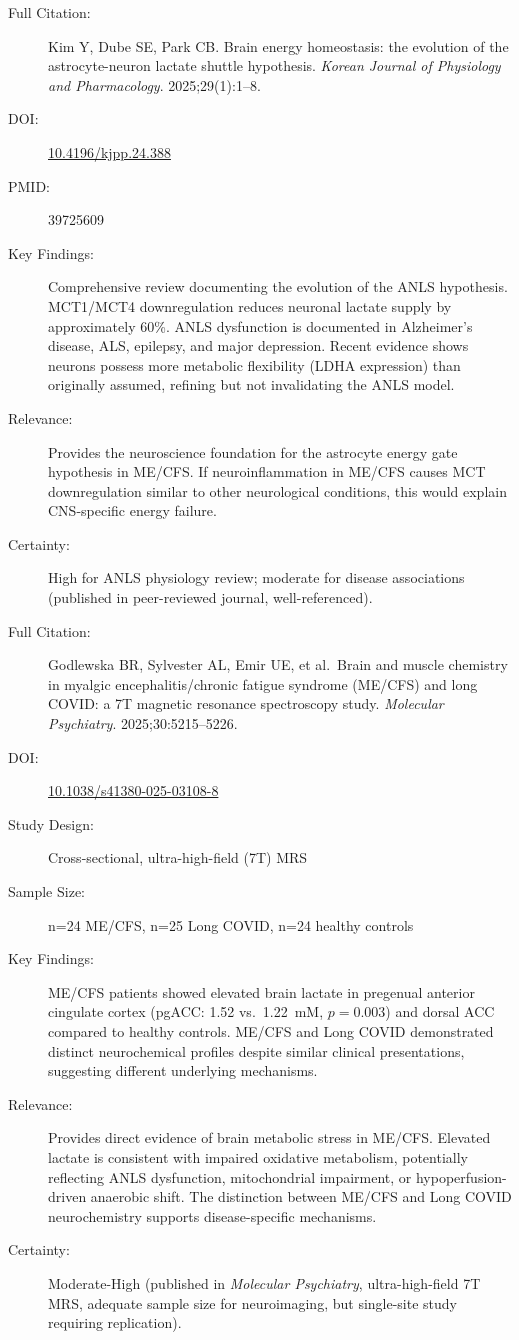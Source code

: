 \begin{description}
    \item[Full Citation:] Kim Y, Dube SE, Park CB. Brain energy homeostasis: the evolution of the astrocyte-neuron lactate shuttle hypothesis. \textit{Korean Journal of Physiology and Pharmacology}. 2025;29(1):1--8.
    \item[DOI:] \href{https://doi.org/10.4196/kjpp.24.388}{10.4196/kjpp.24.388}
    \item[PMID:] 39725609
    \item[Key Findings:] Comprehensive review documenting the evolution of the ANLS hypothesis. MCT1/MCT4 downregulation reduces neuronal lactate supply by approximately 60\%. ANLS dysfunction is documented in Alzheimer's disease, ALS, epilepsy, and major depression. Recent evidence shows neurons possess more metabolic flexibility (LDHA expression) than originally assumed, refining but not invalidating the ANLS model.
    \item[Relevance:] Provides the neuroscience foundation for the astrocyte energy gate hypothesis in ME/CFS. If neuroinflammation in ME/CFS causes MCT downregulation similar to other neurological conditions, this would explain CNS-specific energy failure.
    \item[Certainty:] High for ANLS physiology review; moderate for disease associations (published in peer-reviewed journal, well-referenced).
\end{description}

\begin{description}
    \item[Full Citation:] Godlewska BR, Sylvester AL, Emir UE, et al.\ Brain and muscle chemistry in myalgic encephalitis/chronic fatigue syndrome (ME/CFS) and long COVID: a 7T magnetic resonance spectroscopy study. \textit{Molecular Psychiatry}. 2025;30:5215--5226.
    \item[DOI:] \href{https://doi.org/10.1038/s41380-025-03108-8}{10.1038/s41380-025-03108-8}
    \item[Study Design:] Cross-sectional, ultra-high-field (7T) MRS
    \item[Sample Size:] n=24 ME/CFS, n=25 Long COVID, n=24 healthy controls
    \item[Key Findings:] ME/CFS patients showed elevated brain lactate in pregenual anterior cingulate cortex (pgACC: 1.52 vs.\ 1.22~mM, $p = 0.003$) and dorsal ACC compared to healthy controls. ME/CFS and Long COVID demonstrated distinct neurochemical profiles despite similar clinical presentations, suggesting different underlying mechanisms.
    \item[Relevance:] Provides direct evidence of brain metabolic stress in ME/CFS. Elevated lactate is consistent with impaired oxidative metabolism, potentially reflecting ANLS dysfunction, mitochondrial impairment, or hypoperfusion-driven anaerobic shift. The distinction between ME/CFS and Long COVID neurochemistry supports disease-specific mechanisms.
    \item[Certainty:] Moderate-High (published in \textit{Molecular Psychiatry}, ultra-high-field 7T MRS, adequate sample size for neuroimaging, but single-site study requiring replication).
\end{description}


